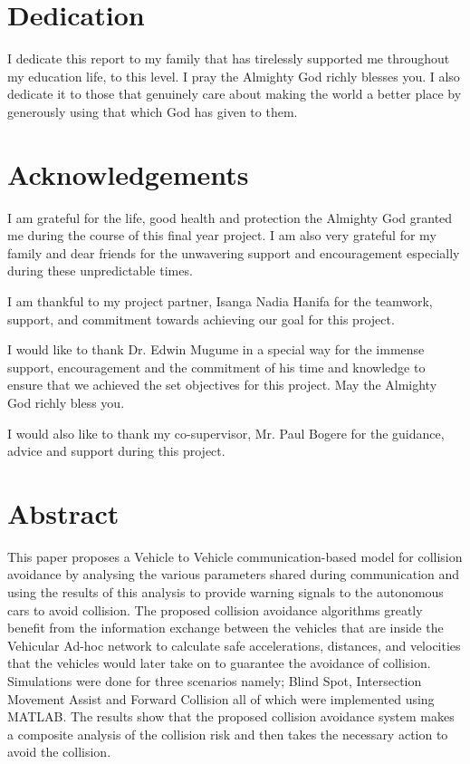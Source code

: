 \documentclass[12pt]{report}
\begin{document}
\newpage

\section*{Dedication}

\begin{center}
I dedicate this report to my family that has tirelessly supported me throughout my education life, to this level. I pray the Almighty God richly blesses you. I also dedicate it to those that genuinely care about making the world a better place by generously using that which God has given to them.
\end{center}




\newpage

\section*{Acknowledgements}

I am grateful for the life, good health and protection the Almighty God granted me during the course of this final year project. I am also very grateful for my family and dear friends for the unwavering support and encouragement especially during these unpredictable times. 

I am thankful to my project partner, Isanga Nadia Hanifa for the teamwork, support, and commitment towards achieving our goal for this project.

I would like to thank Dr. Edwin Mugume in a special way for the immense support, encouragement and the commitment of his time and knowledge to ensure that we achieved the set objectives for this project. May the Almighty God richly bless you.

I would also like to thank my co-supervisor, Mr. Paul Bogere for the guidance, advice and support  during this project.





\newpage



\section*{Abstract}

This paper proposes a Vehicle to Vehicle communication-based model for collision avoidance by analysing the various parameters shared during communication and using the results of this analysis to provide warning signals to the autonomous cars to avoid collision. The proposed collision avoidance algorithms greatly benefit from the information exchange between the vehicles that are inside the Vehicular Ad-hoc network to calculate safe accelerations, distances, and velocities that the vehicles would later take on to guarantee the avoidance of collision. Simulations were done for three scenarios namely; Blind Spot, Intersection Movement Assist and Forward Collision all of which were implemented using MATLAB. The results show that the proposed collision avoidance system makes a composite analysis of the collision risk and then takes the necessary action to avoid the collision.
\end{document}
